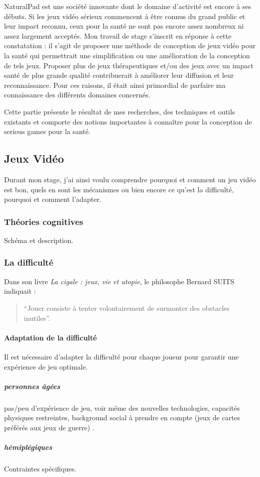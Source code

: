 NaturalPad est une société innovante dont le domaine d'activité est encore à ses débuts. Si les jeux vidéo sérieux commencent à être connus du grand public et leur impact reconnu, ceux pour la santé ne sont pas encore assez nombreux ni assez largement acceptés. Mon travail de stage s'inscrit en réponse à cette constatation : il s'agit de proposer une méthode de conception de jeux vidéo pour la santé qui permettrait une simplification ou une amélioration de la conception de tels jeux. Proposer plus de jeux  thérapeutiques et/ou des jeux avec un impact santé de plus grande qualité contribuerait à améliorer leur diffusion et leur reconnaissance. Pour ces raisons, il était ainsi primordial de parfaire ma connaissance des différents domaines concernés.

Cette partie présente le résultat de mes recherches, des techniques et outils existants et comporte des notions importantes à connaître pour la conception de serious games pour la santé.

	\subsection{Jeux Vidéo}
Durant mon stage, j'ai ainsi voulu comprendre pourquoi et comment un jeu vidéo est bon, quels en sont les mécanismes ou bien encore ce qu'est la difficulté, pourquoi et comment l'adapter.\\

		\subsubsection{Théories cognitives}
Schéma et description.		
		\subsubsection{La difficulté}
Dans son livre \emph{La cigale : jeux, vie et utopie}, le philosophe Bernard SUITS indiquait : \begin{quote}{“Jouer consiste à tenter volontairement de surmonter des obstacles inutiles”}.  \end{quote}
		
			\paragraph{Adaptation de la difficulté\\}
Il est nécessaire d'adapter la difficulté pour chaque joueur pour garantir une expérience de jeu optimale.			
				\subparagraph{personnes âgées\\}
pas/peu d'expérience de jeu, voir même des nouvelles technologies, capacités physiques restreintes, background social à prendre en compte (jeux de cartes préférés aux jeux de guerre) \cite{Csik75}.
				\subparagraph{hémiplégiques\\}		
Contraintes spécifiques.					
